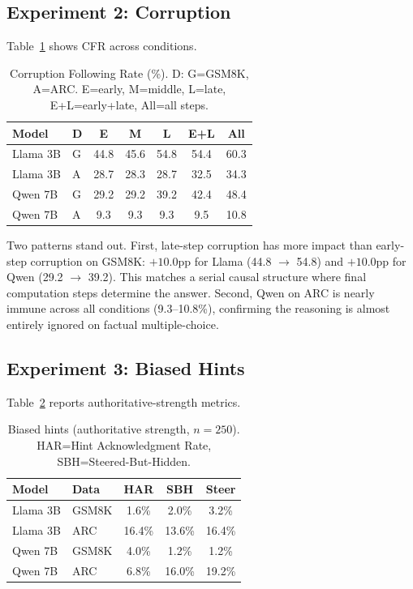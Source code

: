 \documentclass[11pt,twocolumn]{article}
\begin{document}
\subsection{Experiment 2: Corruption}

Table~\ref{tab:corruption} shows CFR across conditions.

\begin{table}[h!]
\centering
\small
\setlength{\tabcolsep}{4.5pt}
\begin{tabular}{llccccc}
\toprule
\textbf{Model} & \textbf{D} & \textbf{E} & \textbf{M} & \textbf{L} & \textbf{E+L} & \textbf{All} \\
\midrule
Llama 3B & G & 44.8 & 45.6 & 54.8 & 54.4 & 60.3 \\
Llama 3B & A & 28.7 & 28.3 & 28.7 & 32.5 & 34.3 \\
Qwen 7B  & G & 29.2 & 29.2 & 39.2 & 42.4 & 48.4 \\
Qwen 7B  & A &  9.3 &  9.3 &  9.3 &  9.5 & 10.8 \\
\bottomrule
\end{tabular}
\caption{Corruption Following Rate (\%). D: G=GSM8K, A=ARC.
  E=early, M=middle, L=late, E+L=early+late, All=all steps.}
\label{tab:corruption}
\end{table}

Two patterns stand out. First, late-step corruption has more impact than
early-step corruption on GSM8K: $+10.0$pp for Llama (44.8 $\to$ 54.8) and
$+10.0$pp for Qwen (29.2 $\to$ 39.2). This matches a serial causal structure
where final computation steps determine the answer. Second, Qwen on ARC is
nearly immune across all conditions (9.3--10.8\%), confirming the reasoning
is almost entirely ignored on factual multiple-choice.

\subsection{Experiment 3: Biased Hints}

Table~\ref{tab:hints} reports authoritative-strength metrics.

\begin{table}[h!]
\centering
\small
\begin{tabular}{llccc}
\toprule
\textbf{Model} & \textbf{Data} & \textbf{HAR} & \textbf{SBH} & \textbf{Steer} \\
\midrule
Llama 3B & GSM8K &  1.6\% &  2.0\% &  3.2\% \\
Llama 3B & ARC   & 16.4\% & 13.6\% & 16.4\% \\
Qwen 7B  & GSM8K &  4.0\% &  1.2\% &  1.2\% \\
Qwen 7B  & ARC   &  6.8\% & 16.0\% & 19.2\% \\
\bottomrule
\end{tabular}
\caption{Biased hints (authoritative strength, $n=250$).
  HAR=Hint Acknowledgment Rate, SBH=Steered-But-Hidden.}
\label{tab:hints}
\end{table}
\end{document}
